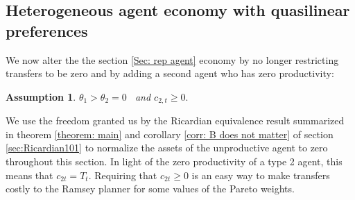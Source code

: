 \documentclass[thmsb,11pt]{article}
\newtheorem{assumption}{Assumption}
\begin{document}
\subsection{Heterogeneous agent economy with quasilinear preferences\label{sec:hetquasilinear}}

 We now alter the
the section \ref{Sec: rep agent} %
 economy by no longer restricting transfers to be zero  and by adding
  a second agent who has zero productivity:
\begin{assumption}
 $\theta_1>\theta_2=0$ \ {\rm  and} $c_{2,t}\geq 0.$
\end{assumption}
We use the freedom granted us by the Ricardian equivalence result summarized in theorem \ref{theorem: main} and corollary \ref{corr: B does not matter}
of  section \ref{sec:Ricardian101} to  normalize the assets of the unproductive agent to zero throughout this section.  In light of the zero productivity of a type 2 agent,
 this means that  $c_{2t} = T_t$.
Requiring that $c_{2t} \geq 0$ is  an easy way to make transfers  costly
to the Ramsey planner for some values of the Pareto weights.

\end{document}
